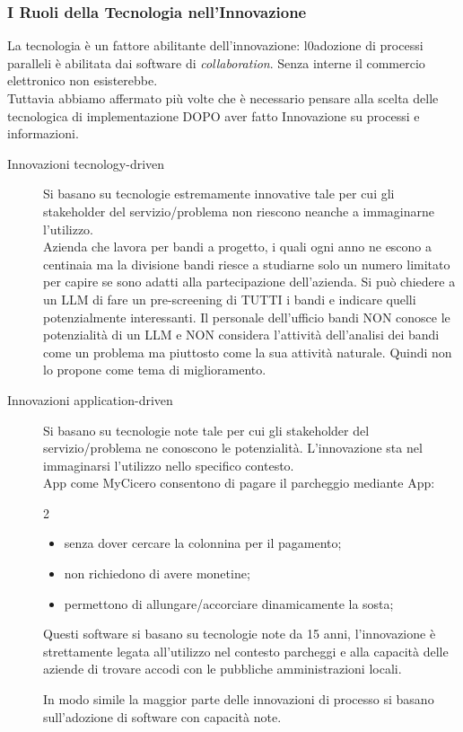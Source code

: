 \subsubsection{I Ruoli della Tecnologia nell'Innovazione}\label{sub:bpr_i_ruoli_della_tecnologia_nell_innovazione} %
La tecnologia è un fattore abilitante dell'innovazione: l0adozione di processi paralleli è abilitata dai software di \textit{collaboration}.
Senza interne il commercio elettronico non esisterebbe.
\\
Tuttavia abbiamo affermato più volte che è necessario pensare alla scelta delle tecnologica di implementazione DOPO aver fatto Innovazione su processi e informazioni.
\begin{description}
    \item[Innovazioni tecnology-driven] Si basano su tecnologie estremamente innovative tale per cui gli stakeholder del servizio/problema non riescono neanche a immaginarne l'utilizzo.
        \\
        Azienda che lavora per bandi a progetto, i quali ogni anno ne escono a centinaia ma la divisione bandi riesce a studiarne solo un numero limitato per capire se sono adatti alla partecipazione dell'azienda.
        Si può chiedere a un LLM di fare un pre-screening di TUTTI i bandi e indicare quelli potenzialmente interessanti.
        Il personale dell'ufficio bandi NON conosce le potenzialità di un LLM e NON considera l'attività dell'analisi dei bandi come un problema ma piuttosto come la sua attività naturale.
        Quindi non lo propone come tema di miglioramento.
    \item[Innovazioni application-driven] Si basano su tecnologie note tale per cui gli stakeholder del servizio/problema ne conoscono le potenzialità.
        L'innovazione sta nel immaginarsi l'utilizzo nello specifico contesto.
        \\
        App come MyCicero consentono di pagare il parcheggio mediante App:
        \begin{multicols}{2}
            \begin{itemize}
                \item senza dover cercare la colonnina per il pagamento;
                \item non richiedono di avere monetine;
                \item permettono di allungare/accorciare dinamicamente la sosta;
            \end{itemize}
        \end{multicols}
        Questi software si basano su tecnologie note da 15 anni, l'innovazione è strettamente legata all'utilizzo nel contesto parcheggi e alla capacità delle aziende di trovare accodi con le pubbliche amministrazioni locali.
        \begin{note}
            In modo simile la maggior parte delle innovazioni di processo si basano sull'adozione di software con capacità note.
        \end{note}
\end{description}
%
